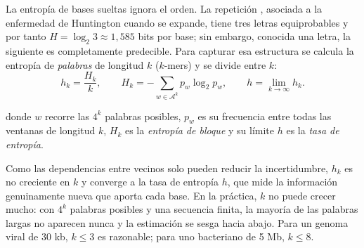 La entropía de bases sueltas ignora el orden. La repetición , asociada a la enfermedad de Huntington cuando se expande, tiene tres letras equiprobables y por tanto $H=\log_2 3\approx1{,}585$ bits por base; sin embargo, conocida una letra, la siguiente es completamente predecible. Para capturar esa estructura se calcula la entropía de \emph{palabras} de longitud $k$ ($k$-mers) y se divide entre $k$:
\begin{equation}\label{eq:01-bloque}
h_k = \frac{H_k}{k}, \qquad H_k = -\sum_{w\in\mathcal{A}^k} p_w \log_2 p_w, \qquad
h = \lim_{k\to\infty} h_k .
\end{equation}

donde $w$ recorre las $4^k$ palabras posibles, $p_w$ es su frecuencia entre todas las ventanas de longitud $k$, $H_k$ es la \emph{entropía de bloque} y su límite $h$ es la \emph{tasa de entropía}.

Como las dependencias entre vecinos solo pueden reducir la incertidumbre, $h_k$ es no creciente en $k$ y converge a la tasa de entropía $h$, que mide la información genuinamente nueva que aporta cada base. En la práctica, $k$ no puede crecer mucho: con $4^k$ palabras posibles y una secuencia finita, la mayoría de las palabras largas no aparecen nunca y la estimación se sesga hacia abajo. Para un genoma viral de 30 kb, $k\le3$ es razonable; para uno bacteriano de 5 Mb, $k\le 8$.


